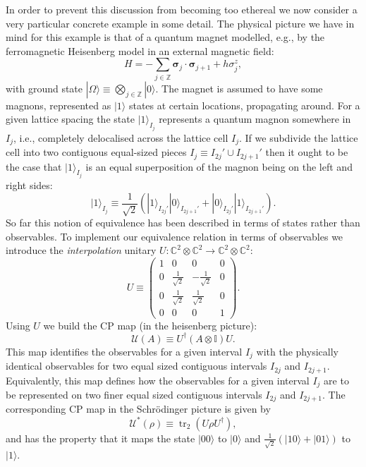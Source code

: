 \documentclass[11pt]{amsart}
\DeclareMathOperator{\tr}{tr}
\theoremstyle{plain}%
\theoremstyle{definition}
\theoremstyle{remark}
\begin{document}
In order to prevent this discussion from becoming too ethereal we now consider a very particular concrete example in some detail. The physical picture we have in mind for this example is that of a quantum magnet modelled, e.g., by the ferromagnetic Heisenberg model in an external magnetic field:
\begin{equation}
	H = -\sum_{j\in\mathbb{Z}} \boldsymbol{\sigma}_j\cdot\boldsymbol{\sigma}_{j+1} + h\sigma^z_j,
\end{equation}
with ground state $|\Omega\rangle \equiv \bigotimes_{j\in\mathbb{Z}} |0\rangle$. The magnet is assumed to have some magnons, represented as $|1\rangle$ states at certain locations, propagating around. For a given lattice spacing the state $|1\rangle_{I_j}$ represents a quantum magnon somewhere in $I_j$, i.e., completely delocalised across the lattice cell $I_j$. If we subdivide the lattice cell into two contiguous equal-sized pieces $I_j \equiv I_{2j}'\cup I_{2j+1}'$ then it ought to be the case that $|1\rangle_{I_j}$ is an equal superposition of the magnon being on the left and right sides:
\begin{equation}
	|1\rangle_{I_j} \equiv \frac{1}{\sqrt{2}} \left(|1\rangle_{I_{2j}'}|0\rangle_{I_{2j+1}'}+|0\rangle_{I_{2j}'}|1\rangle_{I_{2j+1}'}\right).
\end{equation}
So far this notion of equivalence has been described in terms of states rather than observables. To implement our equivalence relation in terms of observables we introduce the \emph{interpolation} unitary $U:\mathbb{C}^2\otimes \mathbb{C}^2\rightarrow \mathbb{C}^2\otimes \mathbb{C}^2$:
\begin{equation}
	U \equiv \begin{pmatrix} 1 & 0 & 0 & 0 \\ 0 & \frac{1}{\sqrt{2}} & -\frac{1}{\sqrt{2}} & 0 \\ 0 & \frac{1}{\sqrt{2}} & \frac{1}{\sqrt{2}} & 0 \\ 0 & 0 & 0 & 1\end{pmatrix}.
\end{equation}
Using $U$ we build the CP map (in the heisenberg picture):
\begin{equation}
	\mathcal{U}(A) \equiv U^\dag (A\otimes \mathbb{I}) U.
\end{equation}
This map identifies the observables for a given interval $I_j$ with the physically identical observables for two equal sized contiguous intervals $I_{2j}$ and $I_{2j+1}$. Equivalently, this map defines how the observables for a given interval $I_j$ are to be represented on two finer equal sized contiguous intervals $I_{2j}$ and $I_{2j+1}$.
The corresponding CP map in the Schr\"odinger picture is given by
\begin{equation}
	\mathcal{U}^{*}(\rho) \equiv \tr_2( U \rho U^\dag),
\end{equation}
and has the property that it maps the state $|00\rangle$ to $|0\rangle$ and $\frac{1}{\sqrt{2}} \left(|10\rangle+|01\rangle\right)$ to $|1\rangle$. 
\end{document}
